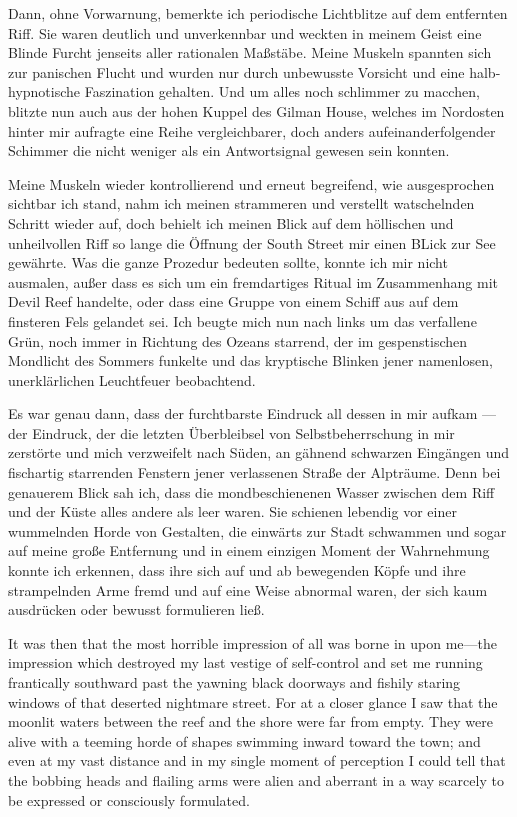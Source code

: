 Dann, ohne Vorwarnung, bemerkte ich periodische Lichtblitze auf dem entfernten Riff. Sie waren deutlich und unverkennbar und weckten in meinem Geist eine Blinde Furcht jenseits aller rationalen Maßstäbe. Meine Muskeln spannten sich zur panischen Flucht und wurden nur durch unbewusste Vorsicht und eine halb-hypnotische Faszination gehalten. Und um alles noch schlimmer zu macchen, blitzte nun auch aus der hohen Kuppel des Gilman House, welches im Nordosten hinter mir aufragte eine Reihe vergleichbarer, doch anders aufeinanderfolgender Schimmer die nicht weniger als ein Antwortsignal gewesen sein konnten.

Meine Muskeln wieder kontrollierend und erneut begreifend, wie ausgesprochen sichtbar ich stand, nahm ich meinen strammeren und verstellt watschelnden Schritt wieder auf, doch behielt ich meinen Blick auf dem höllischen und unheilvollen Riff so lange die Öffnung der South Street mir einen BLick zur See gewährte. Was die ganze Prozedur bedeuten sollte, konnte ich mir nicht ausmalen, außer dass es sich um ein fremdartiges Ritual im Zusammenhang mit Devil Reef handelte, oder dass eine Gruppe von einem Schiff aus auf dem finsteren Fels gelandet sei. Ich beugte mich nun nach links um das verfallene Grün, noch immer in Richtung des Ozeans starrend, der im gespenstischen Mondlicht des Sommers funkelte und das kryptische Blinken jener namenlosen, unerklärlichen Leuchtfeuer beobachtend.

Es war genau dann, dass der furchtbarste Eindruck all dessen in mir aufkam --- der Eindruck, der die letzten Überbleibsel von Selbstbeherrschung in mir zerstörte und mich verzweifelt nach Süden, an gähnend schwarzen Eingängen und fischartig starrenden Fenstern jener verlassenen Straße der Alpträume. Denn bei genauerem Blick sah ich, dass die mondbeschienenen Wasser zwischen dem Riff und der Küste alles andere als leer waren. Sie schienen lebendig vor einer wummelnden Horde von Gestalten, die einwärts zur Stadt schwammen und sogar auf meine große Entfernung und in einem einzigen Moment der Wahrnehmung konnte ich erkennen, dass ihre sich auf und ab bewegenden Köpfe und ihre strampelnden Arme fremd und auf eine Weise abnormal waren, der sich kaum ausdrücken oder bewusst formulieren ließ.

      It was then that the most horrible impression of all was borne in upon me—the impression which destroyed my last vestige of self-control and set me running frantically southward past the yawning black doorways and fishily staring windows of that deserted nightmare street. For at a closer glance I saw that the moonlit waters between the reef and the shore were far from empty. They were alive with a teeming horde of shapes swimming inward toward the town; and even at my vast distance and in my single moment of perception I could tell that the bobbing heads and flailing arms were alien and aberrant in a way scarcely to be expressed or consciously formulated.

